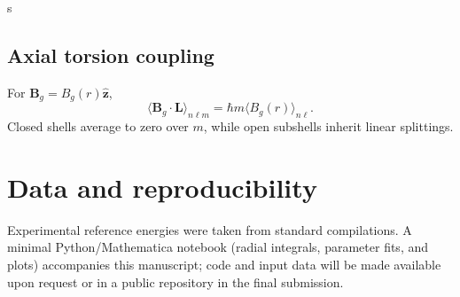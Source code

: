 s\documentclass[12pt]{article}
\begin{document}
\subsection{Axial torsion coupling}
For $\bm{B}_g=B_g(r)\hat{\bm{z}}$,
\begin{equation}
\big\langle \bm{B}_g\cdot \bm{L} \big\rangle_{n\ell m} = \hbar m \big\langle B_g(r) \big\rangle_{n\ell}.
\end{equation}
Closed shells average to zero over $m$, while open subshells inherit linear splittings.

\section*{Data and reproducibility}
Experimental reference energies were taken from standard compilations.\cite{NISTXray,Chantler} A minimal Python/Mathematica notebook (radial integrals, parameter fits, and plots) accompanies this manuscript; code and input data will be made available upon request or in a public repository in the final submission.

\cite{BetheSalpeter}       %
\cite{Grant}               %
\cite{Slater}              %
\cite{KrauseOliver}        %
\cite{Chantler}            %
\cite{NISTXray}            %
\cite{NeonPhotoionization} %
\end{document}
